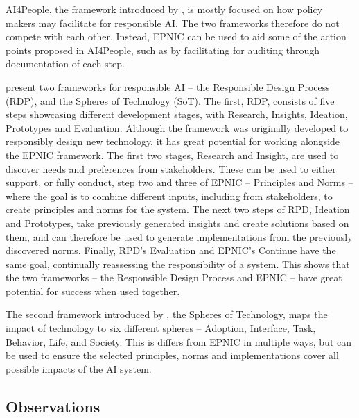 AI4People, the framework introduced by \textcite{Floridi_2018}, is mostly focused on how policy makers may facilitate for responsible AI. The two frameworks therefore do not compete with each other. Instead, EPNIC can be used to aid some of the action points proposed in AI4People, such as by facilitating for auditing through documentation of each step.

\textcite{Peters_2020} present two frameworks for responsible AI -- the Responsible Design Process (RDP), and the Spheres of Technology (SoT). The first, RDP, consists of five steps showcasing different development stages, with Research, Insights, Ideation, Prototypes and Evaluation. Although the framework was originally developed to responsibly design new technology, it has great potential for working alongside the EPNIC framework. The first two stages, Research and Insight, are used to discover needs and preferences from stakeholders. These can be used to either support, or fully conduct, step two and three of EPNIC -- Principles and Norms -- where the goal is to combine different inputs, including from stakeholders, to create principles and norms for the system. The next two steps of RPD, Ideation and Prototypes, take previously generated insights and create solutions based on them, and can therefore be used to generate implementations from the previously discovered norms. Finally, RPD's Evaluation and EPNIC's Continue have the same goal, continually reassessing the responsibility of a system. This shows that the two frameworks -- the Responsible Design Process and EPNIC -- have great potential for success when used together.

The second framework introduced by \textcite{Peters_2020}, the Spheres of Technology, maps the impact of technology to six different spheres -- Adoption, Interface, Task, Behavior, Life, and Society. This is differs from EPNIC in multiple ways, but can be used to ensure the selected principles, norms and implementations cover all possible impacts of the AI system.

\textcite{Siala_2022}
\textcite{vanBruxvoort_2021}
\textcite{Werder_2022}
\textcite{Wright_2018}


\subsection{Observations}


